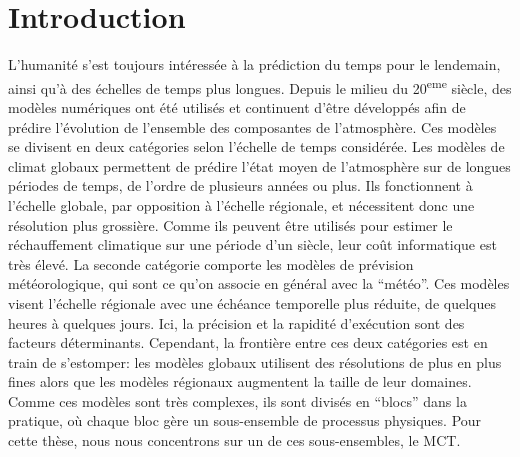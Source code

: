 \chapter*[Introduction]{Introduction}
\renewcommand{\thefigure}{\arabic{figure}}


L'humanité s'est toujours intéressée à la prédiction du temps pour le lendemain,
ainsi qu'à des échelles de temps plus longues. Depuis le milieu du
20\textsuperscript{eme} siècle, des modèles numériques ont été utilisés et
continuent d'être développés afin de prédire l'évolution de l'ensemble des
composantes de l'atmosphère. Ces modèles se divisent en deux catégories selon
l'échelle de temps considérée. Les modèles de climat globaux permettent de
prédire l'état moyen de l'atmosphère sur de longues périodes de temps, de
l'ordre de plusieurs années ou plus. Ils fonctionnent à l'échelle
globale, par opposition à l'échelle régionale, et nécessitent donc une
résolution plus grossière. Comme ils peuvent être utilisés pour estimer le
réchauffement climatique sur une période d'un siècle, leur coût informatique est
très élevé.  La seconde catégorie comporte les modèles de prévision
météorologique, qui sont ce qu'on associe en général avec la \enquote{météo}.  Ces
modèles visent l'échelle régionale avec une échéance temporelle plus réduite, de
quelques heures à quelques jours. Ici, la précision et la rapidité d'exécution
sont des facteurs déterminants.  Cependant, la frontière entre ces deux
catégories est en train de s'estomper: les modèles globaux utilisent des
résolutions de plus en plus fines alors que les modèles régionaux augmentent la
taille de leur domaines. Comme ces modèles sont très complexes, ils sont divisés
en \enquote{blocs} dans la pratique, où chaque bloc gère un sous-ensemble de processus
physiques. Pour cette thèse, nous nous concentrons sur un de ces sous-ensembles,
le \gls{MCT}.

